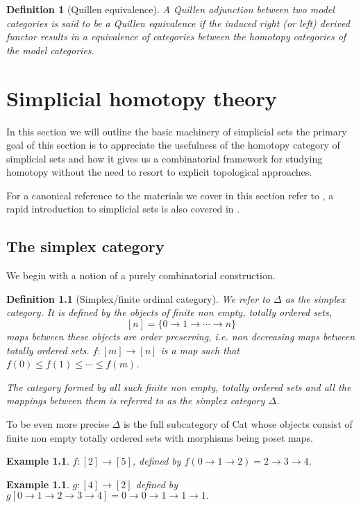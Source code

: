 \documentclass[12pt]{report}
\numberwithin{equation}{section}
\newtheorem{definition}[dummy]{Definition}
\newtheorem{example}[dummy]{Example}
\begin{document}
	\begin{definition}[Quillen equivalence]
		A Quillen adjunction between two model categories is said to be a Quillen equivalence if the induced right (or left) derived functor results in a equivalence of categories between the homotopy categories of the model categories.
	\end{definition}
	
	
	\chapter{Simplicial homotopy theory}
		
		In this section we will outline the basic machinery of simplicial sets the primary goal of this section is to appreciate the usefulness of the homotopy category of simplicial sets and how it gives us a combinatorial framework for studying homotopy without the need to resort to explicit topological approaches. 
		
		
		For a canonical reference to the materials we cover in this section refer to \cite{Goerss_Jardine_2009}, a rapid introduction to simplicial sets is also covered in \cite{Riehl2011ALI}.
	\section{The simplex category}
	We begin with a notion of a purely combinatorial construction.
	
	\begin{definition}[Simplex/finite ordinal category]
		We refer to $\Delta$ as the simplex category. It is defined by the objects of finite non empty, totally ordered sets,
		\[ [n]=\{0 \to 1 \to \cdots \to n\} \]
		maps between these objects are order preserving, i.e. non decreasing maps between totally ordered sets.
		$f: [m] \to [n]$ is a map such that $f(0) \leq f(1) \leq \cdots \leq f(m)$.
		
		The category formed by all such finite non empty, totally ordered sets and all the mappings between them is referred to as the simplex category $\Delta$.
	\end{definition}
	To be even more precise $\Delta$ is	the full subcategory of $\mathrm{Cat}$ whose objects consist of finite non empty totally ordered sets with morphisms being poset maps.
	
	
	\begin{example}
		$f:[2] \to [5]$, defined by $f(0 \to 1 \to 2) = 2 \to 3 \to 4$.
		
	
	\end{example}	
	\begin{example}
		
		$g:[4] \to [2]$ defined by $g[0 \to 1 \to 2\to 3 \to 4] = 0\to 0 \to 1 \to 1 \to 1.$		
	\end{example}
	
\end{document}
